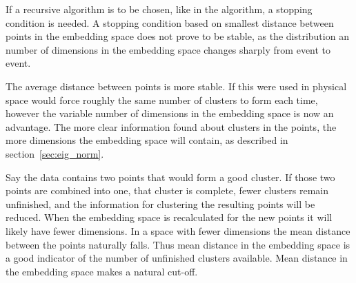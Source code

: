 If a recursive algorithm is to be chosen, like in the \genkt{} algorithm, a stopping condition is needed.
A stopping condition based on smallest distance between points in the embedding space does not prove to be stable,
as the distribution  an number of dimensions in the embedding space changes sharply from event to event.

The average distance between points is more stable.
If this were used in physical space would force roughly the same number of clusters to form each time,
however the variable number of dimensions in the embedding space is now an advantage.
The more clear information found about clusters in the points, the more dimensions the embedding space will contain,
as described in section~\ref{sec:eig_norm}.

Say the data contains two points that would form a good cluster.
If those two points are combined into one, that cluster is complete,
fewer clusters remain unfinished,
and the information for clustering the resulting points will be reduced.
When the embedding space is recalculated for the new points it will likely have fewer dimensions.
In a space with fewer dimensions the mean distance between the points naturally falls.
Thus mean distance in the embedding space is a good indicator of the number of unfinished clusters available.
Mean distance in the embedding space makes a natural cut-off.
